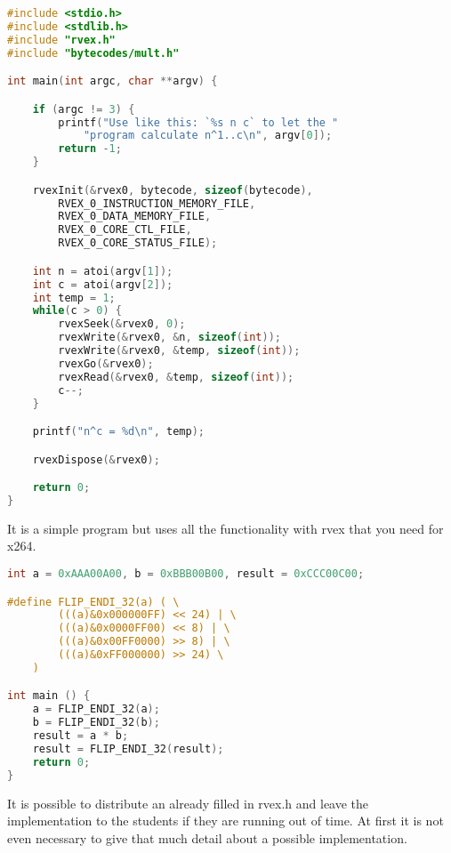 \begin{lstlisting}[language=C,style=C,caption=pow - Microblaze part,label=lst:pow-microblaze]
#include <stdio.h>
#include <stdlib.h>
#include "rvex.h"
#include "bytecodes/mult.h"

int main(int argc, char **argv) {

	if (argc != 3) {
		printf("Use like this: `%s n c` to let the " 
			"program calculate n^1..c\n", argv[0]);
		return -1;
	}

	rvexInit(&rvex0, bytecode, sizeof(bytecode),
		RVEX_0_INSTRUCTION_MEMORY_FILE,
		RVEX_0_DATA_MEMORY_FILE,
		RVEX_0_CORE_CTL_FILE,
		RVEX_0_CORE_STATUS_FILE);

	int n = atoi(argv[1]);
	int c = atoi(argv[2]);
	int temp = 1;
	while(c > 0) {
		rvexSeek(&rvex0, 0);
		rvexWrite(&rvex0, &n, sizeof(int));
		rvexWrite(&rvex0, &temp, sizeof(int));
		rvexGo(&rvex0);
		rvexRead(&rvex0, &temp, sizeof(int));
		c--;
	}

	printf("n^c = %d\n", temp);

	rvexDispose(&rvex0);

	return 0;
}
\end{lstlisting}

It is a simple program but uses all the functionality with rvex that you need for x264. 

\begin{lstlisting}[language=C,style=C,caption=pow - kernel part,label=lst:pow-kernel]
int a = 0xAAA00A00, b = 0xBBB00B00, result = 0xCCC00C00;

#define FLIP_ENDI_32(a) ( \
		(((a)&0x000000FF) << 24) | \
		(((a)&0x0000FF00) << 8) | \
		(((a)&0x00FF0000) >> 8) | \
		(((a)&0xFF000000) >> 24) \
	)

int main () {
	a = FLIP_ENDI_32(a);
	b = FLIP_ENDI_32(b);
	result = a * b;
	result = FLIP_ENDI_32(result);
	return 0;
}
\end{lstlisting}

It is possible to distribute an already filled in rvex.h and leave the implementation to the students if they are running out of time. 
At first it is not even necessary to give that much detail about a possible implementation. 
